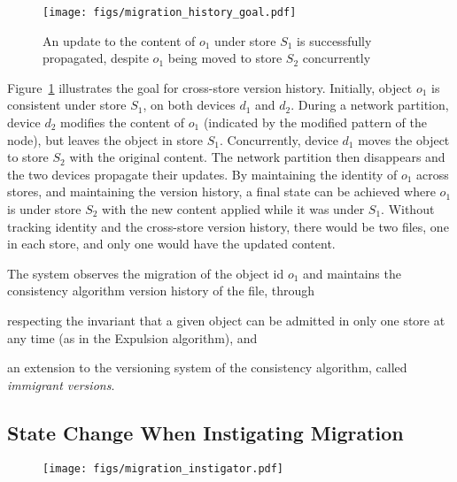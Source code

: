 \begin{figure}[t]
\centering
\texttt{[image: figs/migration\_history\_goal.pdf]}
\caption{An update to the content of $o_1$ under store $S_1$ is successfully
propagated, despite $o_1$ being moved to store $S_2$ concurrently}
\label{fig:migrationhistory}
\end{figure}

Figure~\ref{fig:migrationhistory} illustrates the goal for cross-store version
history. Initially, object $o_1$ is consistent under store $S_1$, on both
devices $d_1$ and $d_2$. During a network partition, device $d_2$ modifies the
content of $o_1$ (indicated by the modified pattern of the node), but leaves the
object in store $S_1$. Concurrently, device $d_1$ moves the object to store
$S_2$ with the original content. The network partition then disappears and the
two devices propagate their updates. By maintaining the identity of $o_1$ across
stores, and maintaining the version history, a final state can be achieved where
$o_1$ is under store $S_2$ with the new content applied while it was under
$S_1$. Without tracking identity and the cross-store version history, there
would be two files, one in each store, and only one would have the updated
content.

The system observes the migration of the object id $o_1$ and maintains the
consistency algorithm version history of the file, through
\begin{inparaenum}[(i)]
\item respecting the invariant that a given object can be admitted in only one
store at any time (as in the Expulsion algorithm), and
\item an extension to the versioning system of the consistency algorithm, called
{\em immigrant versions}.
\end{inparaenum}

\subsection*{State Change When Instigating Migration}

\begin{figure}[t]
\centering
\texttt{[image: figs/migration\_instigator.pdf]}
\caption{}
\label{fig:migrationinstigator}
\end{figure}

